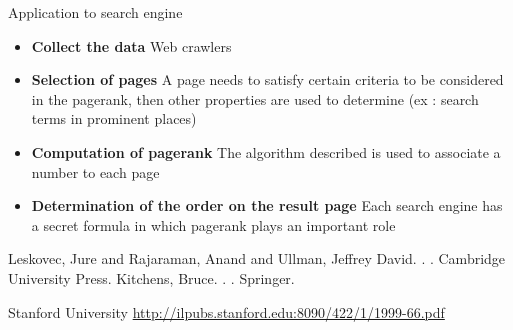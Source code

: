 \documentclass[10pt]{beamer}
\begin{document}
\begin{frame}{Application to search engine}
  \begin{itemize}
    \item \textbf{Collect the data} Web crawlers
    \item \textbf{Selection of pages} A page needs to satisfy certain criteria to be considered in the pagerank, then other properties are used to determine (ex : search terms in prominent places)
    \item \textbf{Computation of pagerank} The algorithm described is used to associate a number to each page
    \item \textbf{Determination of the order on the result page} Each search engine has a secret formula in which pagerank plays an important role
  \end{itemize}
\end{frame}


\begin{frame}
  \begin{thebibliography}{10}
      \beamertemplatebookbibitems
      Leskovec, Jure and Rajaraman, Anand and Ullman, Jeffrey David.
      .
      .
      \newblock Cambridge University Press.
      \beamertemplatearticlebibitems
        Kitchens, Bruce.
        .
        .
        \newblock Springer.
        
        Stanford University
        \newblock  \url{http://ilpubs.stanford.edu:8090/422/1/1999-66.pdf}
  \end{thebibliography}
\end{frame}
\end{document}
